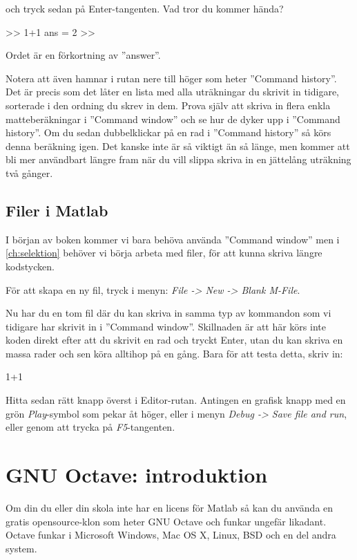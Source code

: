 och tryck sedan på Enter-tangenten. Vad tror du kommer hända?

\begin{matlab}[caption={Hurra, datorn kan räkna!},label={}]
>> 1+1
ans = 2
>>
\end{matlab}

Ordet  är en förkortning av ''answer''.

Notera att  även hamnar i rutan nere till höger som heter ''Command history''. Det är precis som det låter en lista med alla uträkningar du skrivit in tidigare, sorterade i den ordning du skrev in dem. Prova själv att skriva in flera enkla matteberäkningar i ''Command window'' och se hur de dyker upp i ''Command history''. Om du sedan dubbelklickar på en rad i ''Command history'' så körs denna beräkning igen. Det kanske inte är så viktigt än så länge, men kommer att bli mer användbart längre fram när du vill slippa skriva in en jättelång uträkning två gånger.

\subsection{Filer i Matlab}
I början av boken kommer vi bara behöva använda ''Command window'' men i \autoref{ch:selektion} behöver vi börja arbeta med filer, för att kunna skriva längre kodstycken.

För att skapa en ny fil, tryck i menyn: \emph{File -> New -> Blank M-File}.

Nu har du en tom fil där du kan skriva in samma typ av kommandon som vi tidigare har skrivit in i ''Command window''. Skillnaden är att här körs inte koden direkt efter att du skrivit en rad och tryckt Enter, utan du kan skriva en massa rader och sen köra alltihop på en gång. Bara för att testa detta, skriv in:

\begin{matlab}[caption={Skrivit in lite matte},label={}]
1+1
\end{matlab}

Hitta sedan rätt knapp överst i Editor-rutan. Antingen en grafisk knapp med en grön \emph{Play}-symbol som pekar åt höger, eller i menyn \emph{Debug -> Save file and run}, eller genom att trycka på \emph{F5}-tangenten.

\newpage

\section{GNU Octave: introduktion}\label{sec:octave_intro}
Om din du eller din skola inte har en licens för Matlab så kan du använda en gratis opensource-klon som heter GNU Octave och funkar ungefär likadant. Octave funkar i Microsoft Windows, Mac OS X, Linux, BSD och en del andra system.

